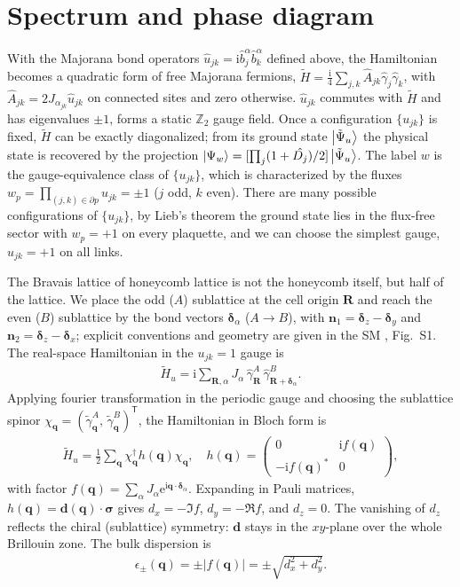 \documentclass[
  aps,
  prl,
  reprint,
  amsmath,
  amssymb,
  superscriptaddress,
  floatfix
]{revtex4-2}
\newcommand{\ee}{\mathrm{e}}
\newcommand{\pp}{\partial}
\newcommand{\ii}{\mathrm{i}}
\renewcommand{\abs}[1]{\left| #1 \right|}
\newcommand{\oA}{\hat{A}}
\newcommand{\oga}{\hat \gamma}
\begin{document}
\section{Spectrum and phase diagram}
\label{sec:results}
With the Majorana bond operators $\hat{u}_{jk}= \ii \hat{b}^ \alpha_j \hat{b}^ \alpha_k$ defined above, the Hamiltonian becomes a quadratic form of free Majorana fermions,
$\tilde{H} = \frac{\ii}{4}\sum_{j,k} \oA_{jk} \oga_j \oga_k$, with
$\oA_{jk} = 2 J_{\alpha_{jk}} \hat u_{jk}$ on connected sites and zero
otherwise.
$\hat{u}_{jk}$ commutes with $\tilde{H}$ and has eigenvalues $\pm 1$, forms a static $\mathbb{Z}_2$ gauge field. Once a configuration $\{u_{jk}\}$ is fixed, $\tilde{H}$ can be exactly diagonalized; from its ground state $\ket{\tilde{\Psi}_u}$ the physical state is recovered by the projection $\ket{\Psi_w} = [\prod_j (1+\hat{D_j})/2] \ket{\tilde{\Psi}_u}$.
The label $w$ is the gauge-equivalence class of $\{u_{jk}\}$, which is characterized by the fluxes $w_p = \prod_{(j,k)\in \pp p} u_{jk} = \pm 1$ ($j$ odd, $k$ even). There are many possible configurations of $\{u_{jk}\}$,
by Lieb's theorem \cite{Lieb1994} the ground state lies in the flux-free sector with $w_p = +1$ on every plaquette, and we can choose the simplest gauge, $u_{jk}=+1$ on all links.

The Bravais lattice of honeycomb lattice is not the honeycomb itself, but half of the lattice. We place the odd ($A$) sublattice at the cell origin $\bm R$ and
reach the even ($B$) sublattice by the bond vectors $\bm\delta_\alpha$
($A\to B$), with $\bm n_1=\bm\delta_z-\bm\delta_y$ and $\bm
n_2=\bm\delta_z-\bm\delta_x$; explicit conventions and geometry are given in the SM
\cite{SM}, Fig.~S1. The real-space Hamiltonian in the ${u_{jk}=1}$ gauge is
\begin{align}
  \tilde{H}_u = \ii \sum_{\bm R,\alpha} J_\alpha\, \oga_{\bm R}^A\, \oga_{\bm R+\bm\delta_\alpha}^B .
\end{align}
Applying fourier transformation in the periodic gauge
and choosing the sublattice spinor
$\chi_{\bm q}=(\tilde\gamma^A_{\bm q},\,\tilde\gamma^B_{\bm q})^{\mathsf T}$,
the Hamiltonian in Bloch form is
\begin{align}
  \tilde{H}_u = \frac{1}{2} \sum_{\bm q} \chi_{\bm q}^\dag h(\bm q) \chi_{\bm q}, \quad h(\bm q) = \begin{pmatrix}
    0 & \ii f(\bm q) \\
    - \ii f(\bm q)^* & 0
  \end{pmatrix}, \label{eq:bloch_Hamiltonian}
\end{align}
with factor
$f(\bm q)=\sum_\alpha J_\alpha \ee^{\ii \bm q\cdot\bm\delta_\alpha}$.
Expanding in Pauli matrices, $h(\bm q)=\bm d(\bm q)\cdot\bm\sigma$ gives $d_x = -\Im f$, $d_y = -\Re f$, and $d_z = 0$.
The vanishing of $d_z$ reflects the chiral (sublattice) symmetry: $\bm d$ stays in the $xy$-plane over the whole Brillouin zone. The bulk dispersion is
\begin{align}
  \epsilon_\pm(\bm q) = \pm \abs{f(\bm q)} = \pm\sqrt{d_x^2+d_y^2}.
\end{align}
\end{document}

